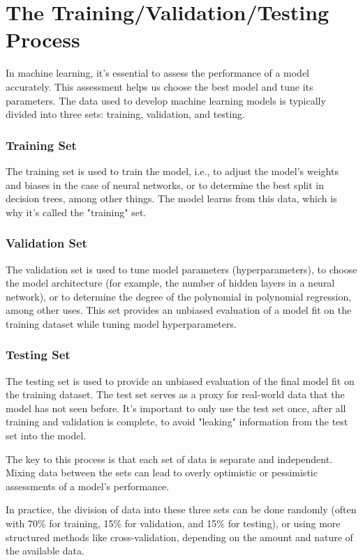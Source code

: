 \chapter{The Training/Validation/Testing Process}

In machine learning, it's essential to assess the performance of a model accurately. This assessment helps us choose the best model and tune its parameters. The data used to develop machine learning models is typically divided into three sets: training, validation, and testing.

\subsection{Training Set}

The training set is used to train the model, i.e., to adjust the model's weights and biases in the case of neural networks, or to determine the best split in decision trees, among other things. The model learns from this data, which is why it's called the "training" set.

\subsection{Validation Set}

The validation set is used to tune model parameters (hyperparameters), to choose the model architecture (for example, the number of hidden layers in a neural network), or to determine the degree of the polynomial in polynomial regression, among other uses. This set provides an unbiased evaluation of a model fit on the training dataset while tuning model hyperparameters. 

\subsection{Testing Set}

The testing set is used to provide an unbiased evaluation of the final model fit on the training dataset. The test set serves as a proxy for real-world data that the model has not seen before. It's important to only use the test set once, after all training and validation is complete, to avoid "leaking" information from the test set into the model.

The key to this process is that each set of data is separate and independent. Mixing data between the sets can lead to overly optimistic or pessimistic assessments of a model's performance.

In practice, the division of data into these three sets can be done randomly (often with 70\% for training, 15\% for validation, and 15\% for testing), or using more structured methods like cross-validation, depending on the amount and nature of the available data.
